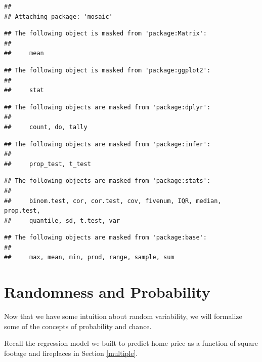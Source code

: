 \documentclass[
]{book}
\begin{document}
\begin{verbatim}
## 
## Attaching package: 'mosaic'
\end{verbatim}

\begin{verbatim}
## The following object is masked from 'package:Matrix':
## 
##     mean
\end{verbatim}

\begin{verbatim}
## The following object is masked from 'package:ggplot2':
## 
##     stat
\end{verbatim}

\begin{verbatim}
## The following objects are masked from 'package:dplyr':
## 
##     count, do, tally
\end{verbatim}

\begin{verbatim}
## The following objects are masked from 'package:infer':
## 
##     prop_test, t_test
\end{verbatim}

\begin{verbatim}
## The following objects are masked from 'package:stats':
## 
##     binom.test, cor, cor.test, cov, fivenum, IQR, median, prop.test,
##     quantile, sd, t.test, var
\end{verbatim}

\begin{verbatim}
## The following objects are masked from 'package:base':
## 
##     max, mean, min, prod, range, sample, sum
\end{verbatim}

\hypertarget{randomness-and-probability}{%
\chapter{Randomness and Probability}\label{randomness-and-probability}}

Now that we have some intuition about random variability, we will formalize some of the concepts of probability and chance.

Recall the regression model we built to predict home price as a function of square footage and fireplaces in Section \ref{multiple}.
\end{document}
